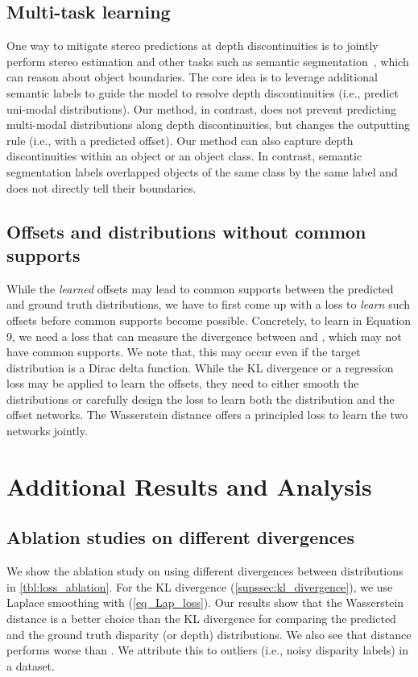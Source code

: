 \documentclass{article}
\newcommand{\ie}{i.e.\xspace}
\begin{document}
\subsection{Multi-task learning}
One way to mitigate stereo predictions at depth discontinuities is to jointly perform stereo estimation and other tasks such as semantic segmentation~\cite{jiao2018look,xu2018pad,jafari2017analyzing}, which can reason about object boundaries. The core idea is to leverage additional semantic labels to guide the model to resolve depth discontinuities (\ie, predict uni-modal distributions). Our method, in contrast, does not prevent predicting multi-modal distributions along depth discontinuities, but changes the outputting rule (\ie,  with a predicted offset). 
Our method can also capture depth discontinuities within an object or an object class. In contrast, semantic segmentation labels overlapped objects of the same class by the same label and does not directly tell their boundaries.

\subsection{Offsets and distributions without common supports} While the \emph{learned} offsets may lead to common supports between the predicted and ground truth distributions, we have to first come up with a loss to \emph{learn} such offsets before common supports become possible.
Concretely, to learn  in Equation 9, we need a loss that can measure the divergence between  and , which may not have common supports. We note that, this may occur even if the target distribution  is a Dirac delta function. 
While the KL divergence or a regression loss may be applied to learn the offsets, they need to either smooth the distributions or carefully design the loss to learn both the distribution and the offset networks.
The Wasserstein distance offers a principled loss to learn the two networks jointly.


\section{Additional Results and Analysis}

\label{supsec:result_analysis}


\subsection{Ablation studies on different divergences}
\label{supsec:loss}
We show the ablation study on using different divergences between distributions in \autoref{tbl:loss_ablation}. For the KL divergence (\autoref{supssec:kl_divergence}), we use Laplace smoothing with  (\autoref{eq_Lap_loss}). Our results show that the Wasserstein distance is a better choice than the KL divergence for comparing the predicted and the ground truth disparity (or depth) distributions. We also see that  distance performs worse than . We attribute this to outliers (\ie, noisy disparity labels) in a dataset.
\end{document}
